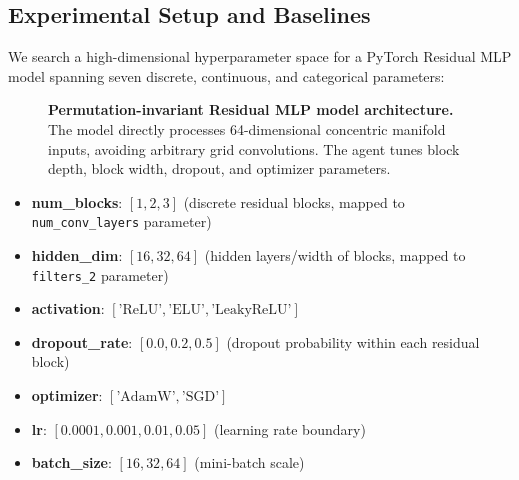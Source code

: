 \documentclass[conference]{IEEEtran}
\begin{document}
\subsection{Experimental Setup and Baselines}
\label{sec:setup_pilot}

We search a high-dimensional hyperparameter space for a PyTorch Residual MLP model spanning seven discrete, continuous, and categorical parameters:
\begin{figure}[!t]
    \centering
    \caption{\textbf{Permutation-invariant Residual MLP model architecture.} The model directly processes 64-dimensional concentric manifold inputs, avoiding arbitrary grid convolutions. The agent tunes block depth, block width, dropout, and optimizer parameters.}
    \label{fig:mlp_arch}
\end{figure}

\begin{itemize}[leftmargin=1.5em,itemsep=1pt]
  \item \textbf{num\_blocks}: $[1, 2, 3]$ (discrete residual blocks, mapped to \texttt{num\_conv\_layers} parameter)
  \item \textbf{hidden\_dim}: $[16, 32, 64]$ (hidden layers/width of blocks, mapped to \texttt{filters\_2} parameter)
  \item \textbf{activation}: $[\text{'ReLU'}, \text{'ELU'}, \text{'LeakyReLU'}]$
  \item \textbf{dropout\_rate}: $[0.0, 0.2, 0.5]$ (dropout probability within each residual block)
  \item \textbf{optimizer}: $[\text{'AdamW'}, \text{'SGD'}]$
  \item \textbf{lr}: $[0.0001, 0.001, 0.01, 0.05]$ (learning rate boundary)
  \item \textbf{batch\_size}: $[16, 32, 64]$ (mini-batch scale)
\end{itemize}
\end{document}
